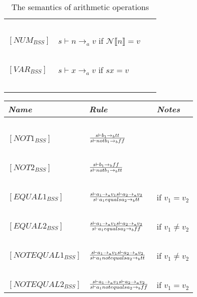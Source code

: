 \begin{table}[h]
\begin{tabular}{|l|l|l|}
			~			&															~																			& ~ \\
	$[NUM_{BSS}]$		& $s \vdash n \rightarrow_{a} v$  if  $\mathcal{N}\llbracket n \rrbracket = v$															& ~ \\
			~			&															~																			& ~ \\
	$[VAR_{BSS}]$		& $s \vdash x \rightarrow_{a} v$  if  $sx = v$														   									& ~ \\
			~			&															~																			& ~ \\
	\hline
	\end{tabular}
	\label{tab:semantics_aritmethic}
	\caption{The semantics of arithmetic operations}
\end{table}

\begin{table}[h]
	\begin{tabular}{|l|l|l|}
	\hline
	\emph{Name}			& \emph{Rule}																															& \emph{Notes} \\ \hline
			~			&															~																			& ~ \\
	$[NOT1_{BSS}]$		& $s \vdash b_{1} \rightarrow_{b} tt \over s \vdash not b_{1} \rightarrow_{b} ff$														& ~ \\
			~			&															~																			& ~ \\
	$[NOT2_{BSS}]$		& $s \vdash b_{1} \rightarrow_{b} ff \over s \vdash not b_{1} \rightarrow_{b} tt$														& ~ \\
			~			&															~																			& ~ \\
	$[EQUAL1_{BSS}]$	& $s \vdash a_{1} \rightarrow_{a} v_{1}  s \vdash a_{2} \rightarrow_{a} v_{2} \over s \vdash a_{1} equals a_{2} \rightarrow_{b} tt$		& if $v_{1} = v_{2}$ \\
			~			&															~																			& ~ \\
	$[EQUAL2_{BSS}]$	& $s \vdash a_{1} \rightarrow_{a} v_{1}  s \vdash a_{2} \rightarrow_{a} v_{2} \over s \vdash a_{1} equals a_{2} \rightarrow_{b} ff$		& if $v_{1} \ne v_{2}$ \\
			~			&															~																			& ~ \\
	$[NOTEQUAL1_{BSS}]$	& $s \vdash a_{1} \rightarrow_{a} v_{1}  s \vdash a_{2} \rightarrow_{a} v_{2} \over s \vdash a_{1} notequals a_{2} \rightarrow_{b} tt$	& if $v_{1}\ne v_{2}$ \\
			~			&															~																			& ~ \\
	$[NOTEQUAL2_{BSS}]$	& $s \vdash a_{1} \rightarrow_{a} v_{1}  s \vdash a_{2} \rightarrow_{a} v_{2} \over s \vdash a_{1} notequals a_{2} \rightarrow_{b} ff$	& if $v_{1} = v_{2}$ \\

\end{tabular}
\end{table}
